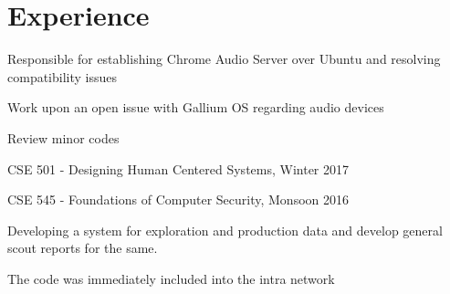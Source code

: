 \documentclass[letterpaper]{deedy-resume} %
\begin{document}
				 \begin{minipage}[t]{0.66\textwidth} %


				 \section{Experience}


				 \vspace{\topsep} %
				 \begin{tightitemize}
				 \item Responsible for establishing Chrome Audio Server over Ubuntu and resolving compatibility issues
				 \item Work upon an open issue with Gallium OS regarding audio devices
				 \item Review minor codes
				 \end{tightitemize}

				 \sectionspace %



				 \begin{tightitemize}
				 \item CSE 501 - Designing Human Centered Systems, Winter 2017 
				 \item CSE 545 - Foundations of Computer Security, Monsoon 2016
				 \end{tightitemize}

				 \sectionspace %



				 \begin{tightitemize}
				 \item Developing a system for exploration and production data and
				 develop general scout reports for the same.
				 \item The code was immediately included into the intra network
				 \end{tightitemize}


\end{minipage}
\end{document}
